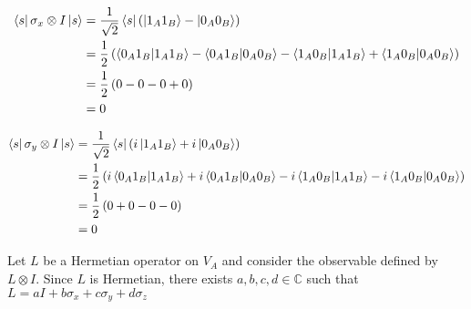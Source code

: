 \documentclass[11pt]{article}
\theoremstyle{definition}
\begin{document}
\begin{equation}
\begin{split}
\bra{s} \sigma_x \otimes I \ket{s}
& = \frac{1}{\sqrt{2}} \bra{s} \left( \ket{1_A1_B} - \ket{0_A0_B} \right) \\
& = \frac{1}{2} \left( \braket{0_A1_B}{1_A1_B} - \braket{0_A1_B}{0_A0_B} - \braket{1_A0_B}{1_A1_B} + \braket{1_A0_B}{0_A0_B} \right) \\
& = \frac{1}{2} \left( 0 - 0 - 0 + 0 \right) \\
& = 0
\end{split}
\end{equation}

\begin{equation}
\begin{split}
\bra{s} \sigma_y \otimes I \ket{s}
& = \frac{1}{\sqrt{2}} \bra{s} \left( i\ket{1_A1_B} + i\ket{0_A0_B} \right) \\
& = \frac{1}{2} \left( i\braket{0_A1_B}{1_A1_B} + i\braket{0_A1_B}{0_A0_B} - i\braket{1_A0_B}{1_A1_B} - i\braket{1_A0_B}{0_A0_B} \right) \\
& = \frac{1}{2} \left( 0 + 0 - 0 - 0 \right) \\
& = 0
\end{split}
\end{equation}

Let $L$ be a Hermetian operator on $V_A$ and consider the observable defined by $L \otimes I$. Since $L$ is Hermetian, there exists $a,b,c,d \in \mathbb{C}$ such that $L = aI + b\sigma_x + c\sigma_y + d\sigma_z$
\end{document}
